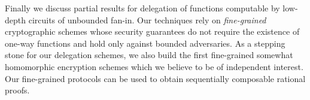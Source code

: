 	
	Finally we discuss partial results for delegation of functions computable by low-depth circuits of unbounded fan-in.
	Our techniques rely on \textit{fine-grained} cryptographic schemes whose security guarantees do not require the existence of one-way functions
	and hold only against bounded adversaries. As a stepping stone for our delegation schemes, we also build 
	the first fine-grained somewhat homomorphic encryption schemes which we believe to be of independent interest.
	Our fine-grained protocols can be used to obtain sequentially composable rational proofs.
